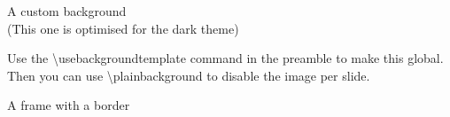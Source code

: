 \documentclass[mathserif, fleqn]{beamer}
\begin{document}
{
  \begin{frame}
    \begin{center}\huge
      A custom background\\
      \small\color{aiphitext!50!aiphibackground}
      (This one is optimised for the dark theme)
    \end{center}

    Use the \textbackslash{}usebackgroundtemplate command in the preamble to make this global.
    Then you can use \textbackslash{}plainbackground to disable the image per slide.
  \end{frame}
}

\begin{frame}[border=aiphipetrol]
  \begin{center}\huge
    A frame with a border
  \end{center}
\end{frame}
\end{document}
